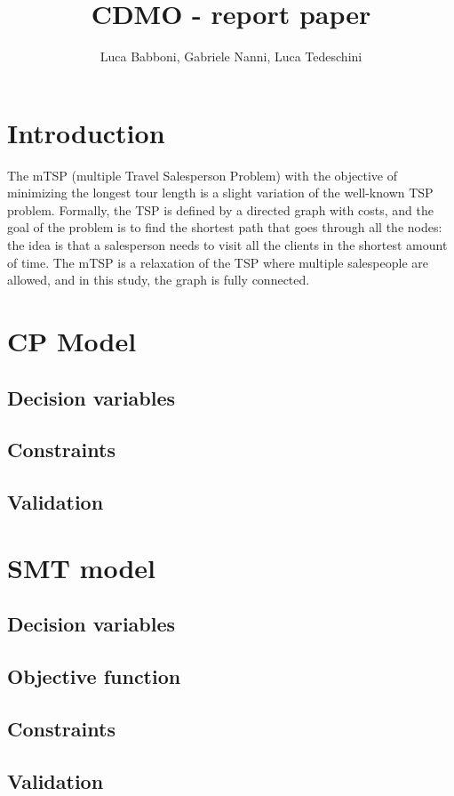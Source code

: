 \documentclass{article}
\title{CDMO - report paper}
\author{Luca Babboni, Gabriele Nanni, Luca Tedeschini}
\begin{document}
\maketitle


\section{Introduction}
The mTSP (multiple Travel Salesperson Problem) with the objective of minimizing the longest tour length is a slight variation of the well-known TSP problem. Formally, the TSP is defined by a directed graph with costs, and the goal of the problem is to find the shortest path that goes through all the nodes: the idea is that a salesperson needs to visit all the clients in the shortest amount of time. The mTSP is a relaxation of the TSP where multiple salespeople are allowed, and in this study, the graph is fully connected.

\section{CP Model}
\subsection{Decision variables}
\subsection{Constraints}
\subsection{Validation}
\section{SMT model}
\subsection{Decision variables}
\subsection{Objective function}
\subsection{Constraints}
\subsection{Validation}
\end{document}
